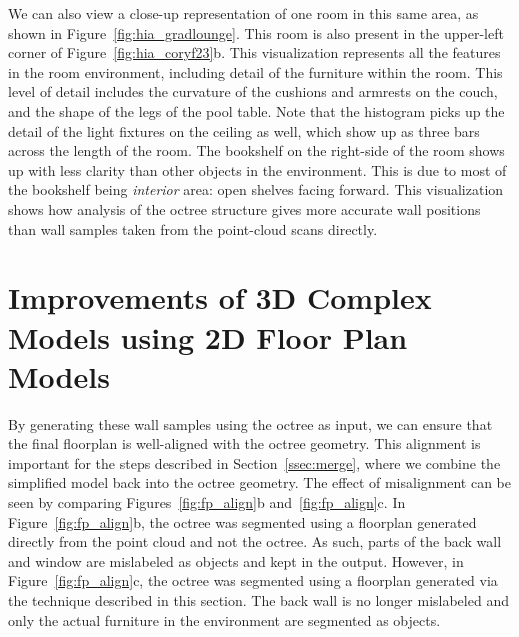 \documentclass[12pt,onecolumn,oneside]{book}
\begin{document}
We can also view a close-up representation of one room in this same area, as shown in Figure~\ref{fig:hia_gradlounge}.  This room is also present in the upper-left corner of Figure~\ref{fig:hia_coryf23}b.  This visualization represents all the features in the room environment, including detail of the furniture within the room.  This level of detail includes the curvature of the cushions and armrests on the couch, and the shape of the legs of the pool table.  Note that the histogram picks up the detail of the light fixtures on the ceiling as well, which show up as three bars across the length of the room.  The bookshelf on the right-side of the room shows up with less clarity than other objects in the environment.  This is due to most of the bookshelf being {\it interior} area: open shelves facing forward.  This visualization shows how analysis of the octree structure gives more accurate wall positions than wall samples taken from the point-cloud scans directly.


\chapter{Improvements of 3D Complex Models using 2D Floor Plan Models}
\label{ch:better_carving}




By generating these wall samples using the octree as input, we can ensure that the final floorplan is well-aligned with the octree geometry.  This alignment is important for the steps described in Section~\ref{ssec:merge}, where we combine the simplified model back into the octree geometry.  The effect of misalignment can be seen by comparing Figures~\ref{fig:fp_align}b and~\ref{fig:fp_align}c.  In Figure~\ref{fig:fp_align}b, the octree was segmented using a floorplan generated directly from the point cloud and not the octree.  As such, parts of the back wall and window are mislabeled as objects and kept in the output.  However, in Figure~\ref{fig:fp_align}c, the octree was segmented using a floorplan generated via the technique described in this section.  The back wall is no longer mislabeled and only the actual furniture in the environment are segmented as objects.
\end{document}
